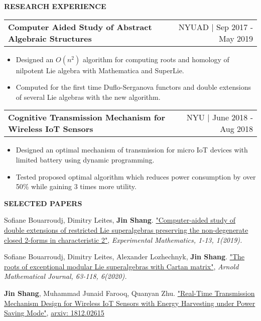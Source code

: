\documentclass[letterpaper,11pt]{article}
\makeatletter
\newcommand{\resitem}[1]{\item  #1}
\newcommand{\resheading}[1]{{\large \colorbox{mygrey}{\begin{minipage}{\linewidth}{\textbf{#1 \vphantom{p\^{E}}}}\end{minipage}}}}
\newcommand{\ressubsubheading}[2]{
\begin{tabular*}{1.04\linewidth}{l@{\extracolsep{\fill}}r}
	\textbf{#1} & #2 \\
\end{tabular*}\vspace{-6pt}}
\makeatother
\begin{document}
\resheading{RESEARCH EXPERIENCE}
	\begin{description}
		\item 
			\ressubsubheading{Computer Aided Study of Abstract Algebraic Structures}{NYUAD $|$ Sep 2017 - May 2019}
				{ \footnotesize
				\begin{itemize}
					\resitem{Designed an $O(n^2)$ algorithm for computing roots and homology of nilpotent Lie algebra with Mathematica and SuperLie.}
					\resitem{Computed for the first time Duflo-Serganova functors and double extensions of several Lie algebras with the new algorithm.}
				\end{itemize}
				}
		\item
			\ressubsubheading{Cognitive Transmission Mechanism for Wireless IoT Sensors}{NYU $|$ June 2018 - Aug 2018}
				{ \footnotesize
				\begin{itemize}
					\resitem{Designed an optimal mechanism of transmission for micro IoT devices with limited battery using dynamic programming.}
					\resitem{Tested proposed optimal algorithm which reduces power consumption by over 50\% while gaining 3 times more utility.}
				\end{itemize}
				}

	\end{description}  %
\resheading{SELECTED PAPERS}
\begin{description}
	
	\item \footnotesize Sofiane Bouarroudj, Dimitry Leites, \textbf{Jin Shang}. \href{https://arxiv.org/abs/1904.09579}{"Computer-aided study of double extensions of restricted Lie superalgebras preserving the non-degenerate closed 2-forms in characteristic 2"}, \textit{Experimental Mathematics, 1-13, 1(2019).} 
	\item \footnotesize Sofiane Bouarroudj, Dimitry Leites, Alexander Lozhechnyk, \textbf{Jin Shang}. \href{https://arxiv.org/abs/1904.09578}{"The roots of exceptional modular Lie superalgebras with Cartan matrix"}, \textit{Arnold Mathematical Journal, 63-118, 6(2020).} 
	\item \footnotesize  \textbf{Jin Shang}, Muhammad Junaid Farooq, Quanyan Zhu. \href{https://arxiv.org/abs/1812.02615}{"Real-Time Transmission Mechanism Design for Wireless IoT Sensors with Energy Harvesting under Power Saving Mode"}, \href{https://arxiv.org/abs/1812.02615}{arxiv: 1812.02615}
\end{description}
\end{document}
